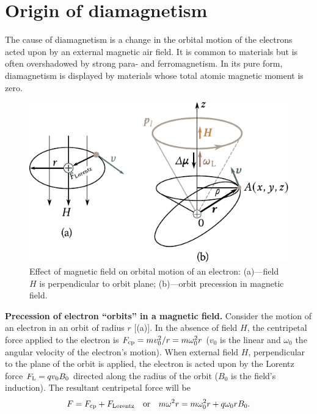 \section{Origin of diamagnetism}\label{sec:66}

The cause of diamagnetism is a change in the orbital motion of the electrons acted upon by an external magnetic air field. It is common to materials but is often overshadowed by strong para- and ferromagnetism. In its pure form, diamagnetism is displayed by materials whose total atomic magnetic moment is zero.

\begin{figure}[t]
	\begin{center}
		\includegraphics[scale=1]{figures/ch_07/fig_7_11.pdf}
		\caption[]{Effect of magnetic field on orbital motion of an electron: (a)---field $H$ is perpendicular to orbit plane; (b)---orbit precession in magnetic field.}
		\label{fig:7_11}
	\end{center}
	\vspace{-0.7cm}
\end{figure}

\textbf{Precession of electron ``orbits'' in a magnetic field.} Consider the motion of an electron in an orbit of radius $r$ [(a)]. In the
absence of field $H$, the centripetal force applied to the electron is $F_{\text{cp}}=mv_0^2/r=m\omega_0^2r$ ($v_0$ is the linear and $\omega_0$ the angular velocity of the electron's motion). When external field $H$, perpendicular to the plane of the orbit is applied, the electron is acted upon by the Lorentz force $F_{\text{L}}=qv_0B_0$ directed along the radius of the orbit ($B_0$ is the field's induction). The resultant centripetal force will be
\begin{equation*}
    F = F_{\text{cp}} + F_{\text{Lorentz}} \quad\text{or}\quad m \omega^2 r = m \omega_0^2 r + q \omega_0 r B_0.
\end{equation*}

